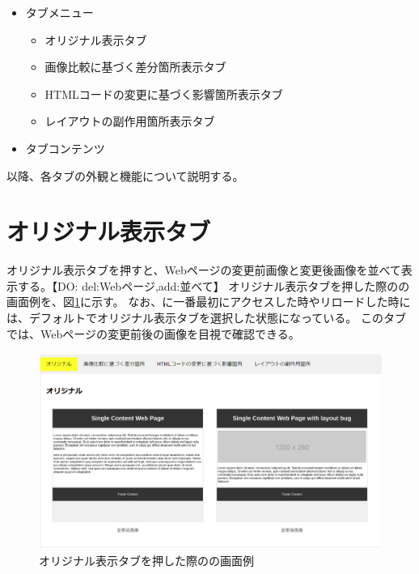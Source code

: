 \begin{itemize}
    \item[①] タブメニュー
          \begin{itemize}
              \item オリジナル表示タブ
              \item 画像比較に基づく差分箇所表示タブ
              \item HTMLコードの変更に基づく影響箇所表示タブ
              \item レイアウトの副作用箇所表示タブ
          \end{itemize}
    \item[②] タブコンテンツ
\end{itemize}
\par
以降、各タブの外観と機能について説明する。



\section{オリジナル表示タブ}\label{sec:original_tab}
オリジナル表示タブを押すと、Webページの変更前画像と変更後画像を並べて表示する。【DO: del:Webページ,add:並べて】
オリジナル表示タブを押した際の\toolName の画面例を、図\ref{fig: Appearance_original_tab}に示す。
なお、\toolName に一番最初にアクセスした時やリロードした時には、デフォルトでオリジナル表示タブを選択した状態になっている。
このタブでは、Webページの変更前後の画像を目視で確認できる。
\begin{figure}[tp]
    \begin{center}
        \includegraphics[width=1.0\columnwidth]{image/3_original_tab.png}
        \caption{オリジナル表示タブを押した際の\toolName の画面例}
        \label{fig: Appearance_original_tab}
    \end{center}
\end{figure}



